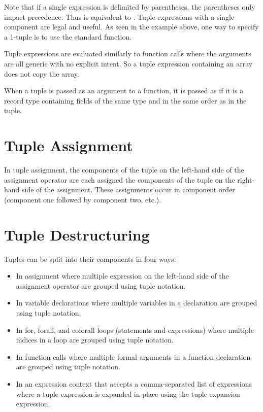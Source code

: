 Note that if a single expression is delimited by parentheses, the
parentheses only impact precedence.  Thus  is equivalent
to .  Tuple expressions with a single component are legal and
useful.  As seen in the example above, one way to specify a 1-tuple is
to use the standard  function.

Tuple expressions are evaluated similarly to function calls where the
arguments are all generic with no explicit intent.  So a tuple
expression containing an array does not copy the array.  

When a tuple is passed as an argument to a function, it is passed as
if it is a record type containing fields of the same type and in
the same order as in the tuple.

\section{Tuple Assignment}
\label{Tuple_Assignment}

In tuple assignment, the components of the tuple on the left-hand side
of the assignment operator are each assigned the components of the
tuple on the right-hand side of the assignment.  These assignments
occur in component order (component one followed by component two,
etc.).

\section{Tuple Destructuring}
\label{Tuple_Destructuring}

Tuples can be split into their components in four ways:
\begin{itemize}
\item In assignment where multiple expression on the left-hand side of
the assignment operator are grouped using tuple notation.
\item In variable declarations where multiple variables in a
declaration are grouped using tuple notation.
\item In for, forall, and coforall loops (statements and expressions)
where multiple indices in a loop are grouped using tuple notation.
\item In function calls where multiple formal arguments in a function
declaration are grouped using tuple notation.
\item In an expression context that accepts a comma-separated list of
expressions where a tuple expression is expanded in place using the
tuple expansion expression.
\end{itemize}

